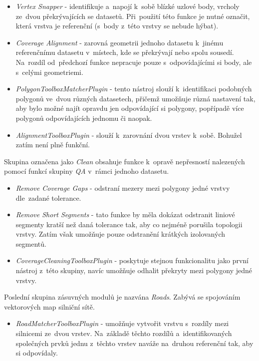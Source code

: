 \begin{itemize}
 \item \textit{Vertex Snapper} - identifikuje a~napojí k~sobě blízké uzlové
    body, vrcholy ze~dvou překrývajících se datasetů. Při~použití této funkce
    je nutné označit, která vrstva je referenční (s~body z~této vrstvy se 
    nebude hýbat).
 \item \textit{Coverage Alignment} - zarovná geometrii jednoho datasetu 
    k~jinému referenčnímu data\-setu v~místech, kde se překrývají nebo spolu
    sousedí. Na~rozdíl od~předchozí funkce ne\-pra\-cuje pouze s~odpovídajícími
    si body, ale s~celými geometriemi.
 \item \textit{PolygonToolboxMatcherPlugin} - tento nástroj slouží k~identifikaci
    podobných polygonů ve~dvou různých datasetech, přičemž umožňuje různá 
    nastavení tak, aby bylo možné najít opravdu jen odpovídající si polygony,
    popřípadě více polygonů odpovídajících jednomu či naopak. 
 \item \textit{AlignmentToolboxPlugin} - slouží k~zarovnání dvou vrstev k~sobě.
    Bohužel zatím není plně funkční.
\end{itemize}

Skupina označena jako \textit{Clean} obsahuje funkce k~opravě nepřesností
nalezených pomocí funkcí skupiny \textit{QA} v~rámci jednoho datasetu.

\begin{itemize}
 \item \textit{Remove Coverage Gaps} - odstraní mezery mezi polygony jedné
    vrstvy dle~zadané tolerance.
 \item \textit{Remove Short Segments} - tato funkce by měla dokázat odstranit
    liniové segmenty kratší než daná tolerance tak, aby co nejméně porušila 
    topologii vrstvy. Zatím však umožňuje pouze odstranění krátkých izolovaných
    segmentů.
 \item \textit{CoverageCleaningToolboxPlugin} - poskytuje stejnou funkcionalitu
    jako první ná\-stroj z~této skupiny, navíc umožňuje odhalit překryty 
    mezi polygony jedné vrstvy.
\end{itemize}

Poslední skupina zásuvných modulů je nazvána \textit{Roads}. Zabývá se 
spojováním vektorových map silniční sítě.

\begin{itemize}
 \item \textit{RoadMatcherToolboxPlugin} - umožňuje vytvořit vrstvu s~rozdíly
    mezi silnicemi ze~dvou vrstev. Na~základě těchto rozdílů a~identifikovaných
    společných prvků jednu z~těchto vrstev naváže na~druhou referenční tak, 
    aby si odpovídaly.
\end{itemize}


